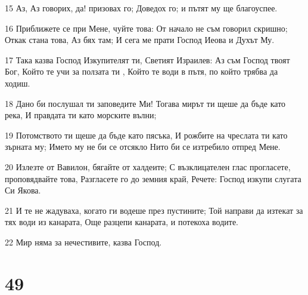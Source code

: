 \par 15 Аз, Аз говорих, да! призовах го; Доведох го; и пътят му ще благоуспее.
\par 16 Приближете се при Мене, чуйте това: От начало не съм говорил скришно; Откак стана това, Аз бях там; И сега ме прати Господ Иеова и Духът Му.
\par 17 Така казва Господ Изкупителят ти, Светият Израилев: Аз съм Господ твоят Бог, Който те учи за ползата ти , Който те води в пътя, по който трябва да ходиш.
\par 18 Дано би послушал ти заповедите Ми! Тогава мирът ти щеше да бъде като река, И правдата ти като морските вълни;
\par 19 Потомството ти щеше да бъде като пясъка, И рожбите на чреслата ти като зърната му; Името му не би се отсякло Нито би се изтребило отпред Мене.
\par 20 Излезте от Вавилон, бягайте от халдеите; С възклицателен глас прогласете, проповядвайте това, Разгласете го до земния край, Речете: Господ изкупи слугата Си Якова.
\par 21 И те не жадуваха, когато ги водеше през пустините; Той направи да изтекат за тях води из канарата, Още разцепи канарата, и потекоха водите.
\par 22 Мир няма за нечестивите, казва Господ.

\chapter{49}

